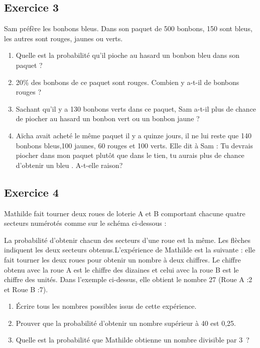 \documentclass[10pt,a4paper,landscape]{article}
\begin{document}
\begin{multicols}{3}
\subsection*{Exercice 3}

Sam préfère les bonbons bleus. 
Dans son paquet de 500 bonbons, 150 sont bleus, les autres sont rouges, jaunes ou verts.

\begin{enumerate}
    \item Quelle est la probabilité qu’il pioche au hasard un bonbon bleu dans son paquet ?
    \item 20\% des bonbons de ce paquet sont rouges. Combien y a-t-il de bonbons rouges ?     
    \item Sachant qu’il y a 130 bonbons verts dans ce paquet, Sam a-t-il plus de chance de piocher au hasard un bonbon vert ou un bonbon jaune ?
    \item Aïcha avait acheté le même paquet il y a quinze jours, il ne lui reste que 140 bonbons bleus,100 jaunes, 60 rouges et 100 verts. Elle dit à Sam : \og Tu devrais piocher dans mon paquet plutôt que dans le tien, tu aurais plus de chance d’obtenir un bleu \fg.
A-t-elle raison? 
\end{enumerate}

\subsection*{Exercice 4}

Mathilde fait tourner deux roues de loterie A et B comportant chacune quatre secteurs numérotés comme sur le schéma ci-dessous : 


La probabilité d’obtenir chacun des secteurs d’une roue est la même. Les flèches indiquent les deux secteurs obtenus.L’expérience de Mathilde est la suivante : elle fait tourner les deux roues pour obtenir un nombre à deux chiffres. Le chiffre obtenu avec la roue A est le chiffre des dizaines et celui avec la roue B est le chiffre des unités. Dans l’exemple ci-dessus, elle obtient le nombre 27 (Roue A :2 et Roue B :7).

\begin{enumerate}
    \item Écrire tous les nombres possibles issus de cette expérience.
    \item Prouver que la probabilité d’obtenir un nombre supérieur à 40 est 0,25.
    \item Quelle est la probabilité que Mathilde obtienne un nombre divisible par 3 ?
\end{enumerate}

\end{multicols}
\end{document}
